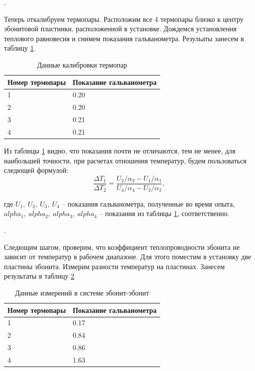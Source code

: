 \documentclass[a4paper, 12pt]{article}
\newcounter{Points}
\newcommand{\point}{\arabic{Points}. \addtocounter{Points}{1}}
\begin{document}
\point Теперь откалибруем термопары. Расположим все 4 термопары близко к центру эбонитовой пластинки, расположенной в установке. Дождемся установления теплового равновесия и снимем показания гальванометра. Резульаты занесем в таблицу \ref{tabl:calibration}.

\begin{table}[h]
    \centering
    \begin{tabular}{|l|l|}
    \hline 
    Номер термопары & Показание гальванометра       \\ \hline
    1               & 0.20                          \\ \hline    
    2               & 0.20                          \\ \hline    
    3               & 0.21                          \\ \hline    
    4               & 0.21                          \\ \hline    
    \end{tabular}
	\caption{Данные калибровки термопар}
    \label{tabl:calibration}
\end{table}

Из таблицы \ref{tabl:calibration} видно, что показания почти не отличаются, тем не менее, для наибольшей точности, при расчетах отношения температур, будем пользоваться следющей формулой:
\begin{equation}
    \label{temperature_ratio}
    \frac{\Delta T_1}{\Delta T_2} = \frac{U_2/\alpha_2-U_1/\alpha_1}{U_4/\alpha_4-U_3/\alpha_3},
\end{equation}

где $U_1,~U_2,~U_3,~U_4$ -- показания гальванометра, полученные во время опыта, $alpha_1,~alpha_2,~alpha_3,~alpha_4$ -- показания из таблицы \ref{tabl:calibration}, соответственно.

\point Следющим шагом, проверим, что коэффициент теплопроводности эбонита не зависит от температур в рабочем диапазоне. Для этого поместим в установку две пластины эбонита. Измерим разности температур на пластинах. Занесем результаты в таблицу \ref{tabl:ebo-ebo}
\begin{table}[h]
    \centering
    \begin{tabular}{|l|l|}
    \hline 
    Номер термопары & Показание гальванометра       \\ \hline
    1               & 0.17                          \\ \hline    
    2               & 0.84                          \\ \hline    
    3               & 0.86                          \\ \hline    
    4               & 1.63                          \\ \hline    
    \end{tabular}
	\caption{Данные измерений в системе эбонит-эбонит}
    \label{tabl:ebo-ebo}
\end{table}
\end{document}
